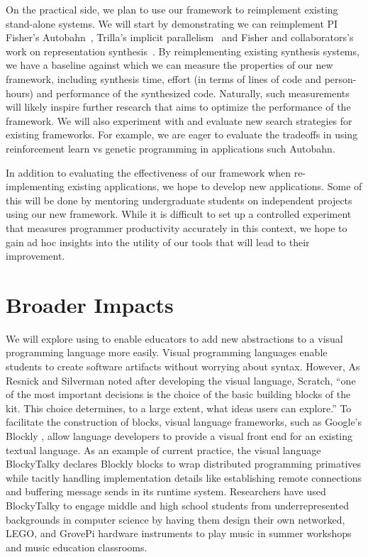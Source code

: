 On the practical side, we plan to use our framework to reimplement
existing stand-alone systems.  We will start by demonstrating we can
reimplement PI Fisher's Autobahn~\cite{autobahn}, Trilla's implicit 
parallelism~\cite{implicit-parallel} and Fisher and collaborators's work on 
representation synthesis~\cite{implicit-parallel}.  
By reimplementing existing synthesis
systems, we have a baseline against which we can measure the properties
of our new framework, including synthesis time, effort (in terms of lines
of code and person-hours) and performance of the synthesized code.  Naturally,
such measurements will likely inspire further research that aims to
optimize the performance of the framework.   We will also experiment
with and evaluate new search strategies for existing frameworks.  For
example, we are eager to evaluate the tradeoffs in using reinforcement
learn vs genetic programming in applications such Autobahn.

In addition to evaluating the effectiveness of our framework when
re-implementing existing applications, we hope to develop new
applications.  Some of this will be done by mentoring undergraduate
students on independent projects using our new framework.  While it is
difficult to set up a controlled experiment that measures programmer
productivity accurately in this context, we hope to gain ad hoc
insights into the utility of our tools that will lead to their improvement.

\section{Broader Impacts}
\label{sec:impact}




We will explore using \rasps to enable educators to add new
abstractions to a visual programming language more easily. Visual programming
languages enable students to create software artifacts without
worrying about syntax.
However, As Resnick and Silverman noted after developing the visual language,
Scratch\cite{Scratch}, ``one of the most important
decisions is the choice of the basic building blocks of the
kit. This choice determines, to a large extent, what ideas
users can explore.'' 
To facilitate the construction of blocks,
visual language frameworks, such
as Google's Blockly \cite{Blocks,BlocklyApps}, allow language
developers to
provide a visual front end for an existing textual language.
As an example of current practice, the visual
language BlockyTalky\cite{BlockyTalky} declares Blockly blocks to wrap distributed
programming primatives while tacitly handling implementation details like establishing
remote connections and buffering message sends in its runtime system.
Researchers have used BlockyTalky to engage middle and high school students
from underrepresented backgrounds in computer science by having them
design their own networked, LEGO, and GrovePi hardware instruments to play music
in summer workshops and music education classrooms.

